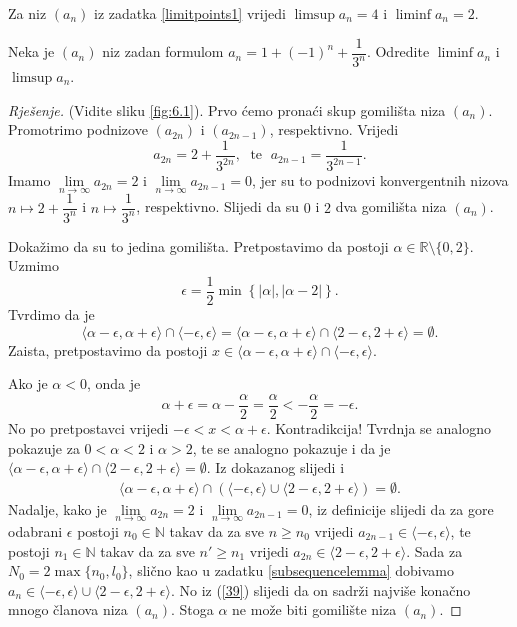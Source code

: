 \begin{remark}
Za niz $(a_n)$ iz zadatka \ref{limitpoints1} vrijedi $\limsup{a_n}=4$ i $\liminf{a_n}=2$.
\end{remark}

\begin{exercise}
\label{limitpoints2}
Neka je $(a_n)$ niz zadan formulom $a_n=1+(-1)^n+\dfrac{1}{3^n}$. Odredite $\liminf{a_n}$ i $\limsup{a_n}$.
\end{exercise}
\begin{proof}[Rješenje]
(Vidite sliku \ref{fig:6.1}). Prvo ćemo pronaći skup gomilišta niza $(a_n)$. Promotrimo podnizove $(a_{2n})$ i $(a_{2n-1})$, respektivno. Vrijedi $$a_{2n}=2+\dfrac{1}{3^{2n}},\;\text{ te }\;a_{2n-1}=\dfrac{1}{3^{2n-1}}.$$ 
Imamo $\lim\limits_{n\to \infty}{a_{2n}}=2$ i $\lim\limits_{n\to \infty}{a_{2n-1}}=0$, jer su to podnizovi konvergentnih nizova $n\mapsto 2+\dfrac{1}{3^n}$ i $n\mapsto \dfrac{1}{3^n}$, respektivno. Slijedi da su $0$ i $2$ dva gomilišta niza $(a_n)$. 

Dokažimo da su to jedina gomilišta. Pretpostavimo da postoji $\alpha\in \mathbb{R}\setminus\{0, 2\}$. Uzmimo $$\epsilon=\dfrac{1}{2}\min\left\{|\alpha|, |\alpha-2|\right\}.$$ 
Tvrdimo da je $$\langle \alpha-\epsilon,\alpha+\epsilon\rangle\cap\langle -\epsilon,\epsilon\rangle=\langle \alpha-\epsilon,\alpha+\epsilon\rangle\cap\langle 2-\epsilon,2+\epsilon\rangle=\emptyset.$$ 
Zaista, pretpostavimo da postoji $x\in \langle\alpha-\epsilon,\alpha+\epsilon\rangle\cap\langle -\epsilon,\epsilon\rangle$.

Ako je $\alpha<0$, onda je
$$\alpha+\epsilon=\alpha-\dfrac{\alpha}{2}=\dfrac{\alpha}{2}<-\dfrac{\alpha}{2}=-\epsilon.$$
No po pretpostavci vrijedi $-\epsilon<x<\alpha+\epsilon$. Kontradikcija! Tvrdnja se analogno pokazuje za $0<\alpha<2$ i $\alpha>2$, te se analogno pokazuje i da je $\langle \alpha-\epsilon,\alpha+\epsilon\rangle\cap\langle 2-\epsilon,2+\epsilon\rangle=\emptyset$.
Iz dokazanog slijedi i 
\begin{gather}
\label{39}
\langle \alpha-\epsilon,\alpha+\epsilon\rangle\cap\left(\langle -\epsilon,\epsilon\rangle \cup\langle 2-\epsilon,2+\epsilon\rangle\right)=\emptyset.
\end{gather}
Nadalje, kako je $\lim\limits_{n\to \infty}{a_{2n}}=2$ i $\lim\limits_{n\to \infty}{a_{2n-1}}=0$, iz definicije slijedi da za gore odabrani $\epsilon$ postoji $n_0\in \mathbb{N}$ takav da za sve $n\geq n_0$ vrijedi $a_{2n-1}\in \langle-\epsilon, \epsilon\rangle$, te postoji $n_1\in \mathbb{N}$ takav da za sve $n'\geq n_1$ vrijedi $a_{2n}\in \langle 2-\epsilon, 2+\epsilon\rangle$. Sada za $N_0=2\max\{n_0, l_0\}$, slično kao u zadatku \ref{subsequencelemma} dobivamo $a_n\in \langle-\epsilon, \epsilon\rangle \cup \langle 2-\epsilon, 2+\epsilon\rangle$. No iz (\ref{39}) slijedi da on sadrži najviše konačno mnogo članova niza $(a_n)$. Stoga $\alpha$ ne može biti gomilište niza $(a_n)$.


\end{proof}

